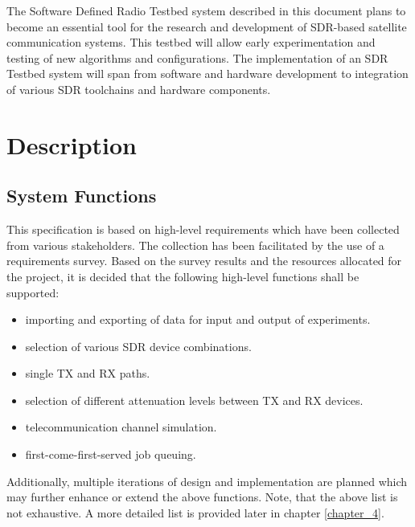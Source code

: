\documentclass[english,titlepage,a4paper]{report}
\begin{document}
The Software Defined Radio Testbed system described in this document plans to become an essential tool for the research and development of SDR-based satellite communication systems.
This testbed will allow early experimentation and testing of new algorithms and configurations.
The implementation of an SDR Testbed system will span from software and hardware development to integration of various SDR toolchains and hardware components.

\printglossary[type=references,numberedsection,style=references,nonumberlist]

\chapter{Description}
\section{System Functions}

This specification is based on high-level requirements which have been collected from various stakeholders.
The collection has been facilitated by the use of a requirements survey.
Based on the survey results and the resources allocated for the project, it is decided that the following high-level functions shall be supported:
\begin{itemize}
\item importing and exporting of data for input and output of experiments.
\item selection of various SDR device combinations.
\item single TX and RX paths.
\item selection of different attenuation levels between TX and RX devices.
\item telecommunication channel simulation.
\item first-come-first-served job queuing.
\end{itemize}

Additionally, multiple iterations of design and implementation are planned which may further enhance or extend the above functions.
Note, that the above list is not exhaustive.
A more detailed list is provided later in chapter \ref{chapter_4}.
\end{document}
